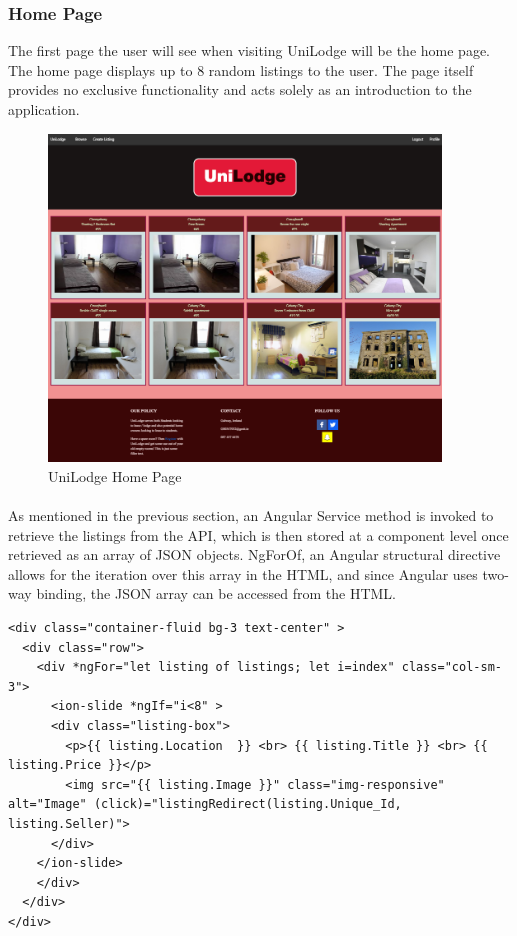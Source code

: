 \subsubsection{Home Page}
The first page the user will see when visiting UniLodge will be the home page. The home page displays up to 8 random listings to the user. The page itself provides no exclusive functionality and acts solely as an introduction to the application. 

\begin{figure}[H]
	\caption{UniLodge Home Page}
	\label{image:home}
	\centering
	\includegraphics[width=0.93\textwidth]{images/home.png}
\end{figure}	

\paragraph{}
As mentioned in the previous section, an Angular Service method is invoked to retrieve the listings from the API, which is then stored at a component level once retrieved as an array of JSON objects. NgForOf, an Angular structural directive allows for the iteration over this array in the HTML, and since Angular uses two-way binding, the JSON array can be accessed from the HTML. \newline

\begin{lstlisting}[caption=NgFor to Display Listings]
<div class="container-fluid bg-3 text-center" >    
  <div class="row">
    <div *ngFor="let listing of listings; let i=index" class="col-sm-3">
      <ion-slide *ngIf="i<8" >   
      <div class="listing-box">
        <p>{{ listing.Location  }} <br> {{ listing.Title }} <br> {{ listing.Price }}</p>
        <img src="{{ listing.Image }}" class="img-responsive" alt="Image" (click)="listingRedirect(listing.Unique_Id, listing.Seller)">
      </div>
    </ion-slide>
    </div>
  </div>
</div>
\end{lstlisting}

